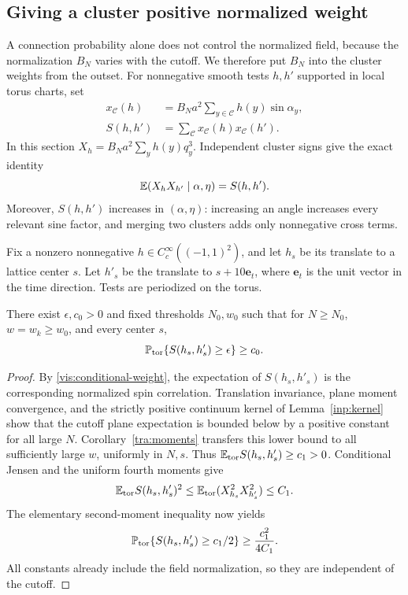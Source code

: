 \subsection{Giving a cluster positive normalized weight}

A connection probability alone does not control the normalized field,
because the normalization $B_N$ varies with the cutoff.  We therefore
put $B_N$ into the cluster weights from the outset.  For nonnegative
smooth tests $h,h'$ supported in local torus charts, set
\begin{equation}\label{vis:weights}
 \begin{split}
 x_{\mathcal C}(h)&=B_Na^2\sum_{y\in\mathcal C}
                         h(y)\sin\alpha_y,\\
 S(h,h')&=\sum_{\mathcal C}x_{\mathcal C}(h)x_{\mathcal C}(h').
 \end{split}
\end{equation}
In this section $X_h=B_Na^2\sum_y h(y)q_y^3$.  Independent cluster
signs give the exact identity
\begin{equation}\label{vis:conditional-weight}
 \mathbb E(X_hX_{h'}\mid\alpha,\eta)=S(h,h').
\end{equation}
Moreover, $S(h,h')$ increases in $(\alpha,\eta)$: increasing an angle
increases every relevant sine factor, and merging two clusters adds
only nonnegative cross terms.

Fix a nonzero nonnegative $h\in C_c^\infty((-1,1)^2)$, and let
$h_s$ be its translate to a lattice center $s$.  Let $h'_s$ be the
translate to $s+10\mathbf e_t$, where $\mathbf e_t$ is the unit vector
in the time direction.  Tests are periodized on the torus.

\begin{lemma}\label{vis:weight-lemma}
There exist $\epsilon,c_0>0$ and fixed thresholds $N_0,w_0$ such that
for $N\ge N_0$, $w=w_k\ge w_0$, and every center $s$,
\begin{equation}\label{vis:positive-weight}
 \mathbb P_{\mathrm{tor}}\{S(h_s,h'_s)\ge\epsilon\}\ge c_0.
\end{equation}
\end{lemma}

\begin{proof}
By \eqref{vis:conditional-weight}, the expectation of $S(h_s,h'_s)$
is the corresponding normalized spin correlation.  Translation
invariance, plane moment convergence, and the strictly positive
continuum kernel of Lemma~\ref{inp:kernel} show that the cutoff plane
expectation is bounded below by a positive constant for all large
$N$.  Corollary~\ref{tra:moments} transfers
this lower bound to all sufficiently large $w$, uniformly in $N,s$.
Thus $\mathbb E_{\mathrm{tor}}S(h_s,h'_s)\ge c_1>0$.
Conditional Jensen and the uniform fourth moments give
\[
 \mathbb E_{\mathrm{tor}}S(h_s,h'_s)^2
 \le\mathbb E_{\mathrm{tor}}(X_{h_s}^2X_{h'_s}^2)\le C_1.
\]
The elementary second-moment inequality now yields
\[
 \mathbb P_{\mathrm{tor}}\{S(h_s,h'_s)\ge c_1/2\}
 \ge\frac{c_1^2}{4C_1}.
\]
All constants already include the field normalization, so they are
independent of the cutoff.
\end{proof}

